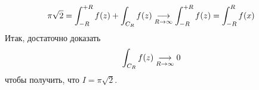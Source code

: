 \begin{align*}
  & \pi \sqrt{2} = \int_{-R}^{+R}f(z) + \int_{C_R}f(z) \underset{R\to \infty}{\longrightarrow} \int_{-R}^{+R} f(z) = \int_{-R}^{R}f(x)
\end{align*}
Итак, достаточно доказать
\begin{align*}
  & \int_{C_R}f(z)  \underset{R\to \infty}{\longrightarrow} 0
\end{align*}
чтобы получить, что $I = \pi \sqrt{2}$.